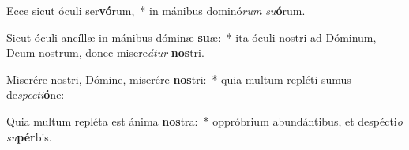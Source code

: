 \item Ecce sicut óculi ser\textbf{vó}rum,~* in mánibus dominó\textit{rum} \textit{su}\textbf{ó}rum.
\item Sicut óculi ancíllæ in mánibus dóminæ \textbf{su}æ:~* ita óculi nostri ad Dóminum, Deum nostrum, donec misere\textit{á}\textit{tur} \textbf{nos}tri.
\item Miserére nostri, Dómine, miserére \textbf{nos}tri:~* quia multum repléti sumus de\textit{spec}\textit{ti}\textbf{ó}ne:
\item Quia multum repléta est ánima \textbf{nos}tra:~* oppróbrium abundántibus, et despécti\textit{o} \textit{su}\textbf{pér}bis.
